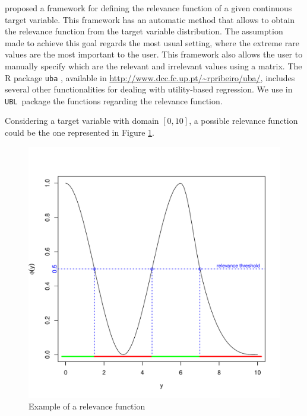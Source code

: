 \documentclass[10pt,a4paper]{article}\usepackage[]{graphicx}\usepackage[]{color}
\makeatletter
\def\maxwidth{ %
  \ifdim\Gin@nat@width>\linewidth
    \linewidth
  \else
    \Gin@nat@width
  \fi
}
\newenvironment{knitrout}{}{} %
\newcommand{\UBLp}{\texttt{UBL}\ package  }
\makeatother
\begin{document}
\cite{ribeiro2011utility} proposed a framework for defining the relevance function of a given continuous target variable. This framework has an automatic method that allows to obtain the relevance function from the target variable distribution. The assumption made to achieve this goal regards the most usual setting, where the extreme rare values are the most important to the user. This framework also allows the user to manually specify which are the relevant and irrelevant values using a matrix. The R package \texttt{uba} \cite{uba}, available in \url{http://www.dcc.fc.up.pt/~rpribeiro/uba/}, includes several other functionalities for dealing with utility-based regression. We use in \UBLp the functions regarding the relevance function.


Considering a target variable with domain $[0,10]$, a possible relevance function could be the one represented in Figure \ref{fig:relev_ex}.

\begin{knitrout}\footnotesize
{}\color{fgcolor}\begin{figure}

{\centering \includegraphics[width=\maxwidth]{figures/UBL-relev_ex-1} 

}

\caption[Example of a relevance function]{Example of a relevance function}\label{fig:relev_ex}
\end{figure}


\end{knitrout}
\end{document}

